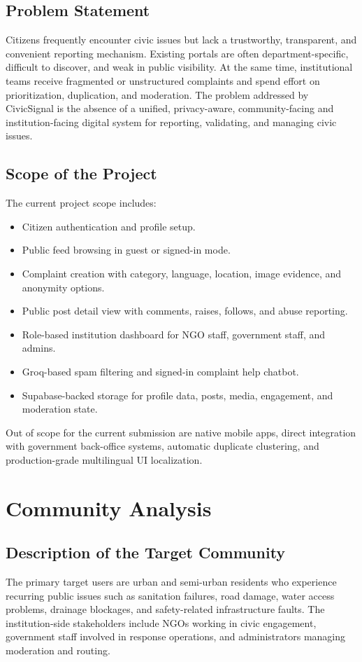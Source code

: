 \documentclass[12pt,a4paper]{report}
\begin{document}
\section{Problem Statement}
Citizens frequently encounter civic issues but lack a trustworthy, transparent, and convenient reporting mechanism. Existing portals are often department-specific, difficult to discover, and weak in public visibility. At the same time, institutional teams receive fragmented or unstructured complaints and spend effort on prioritization, duplication, and moderation. The problem addressed by CivicSignal is the absence of a unified, privacy-aware, community-facing and institution-facing digital system for reporting, validating, and managing civic issues.

\section{Scope of the Project}
The current project scope includes:
\begin{itemize}
  \item Citizen authentication and profile setup.
  \item Public feed browsing in guest or signed-in mode.
  \item Complaint creation with category, language, location, image evidence, and anonymity options.
  \item Public post detail view with comments, raises, follows, and abuse reporting.
  \item Role-based institution dashboard for NGO staff, government staff, and admins.
  \item Groq-based spam filtering and signed-in complaint help chatbot.
  \item Supabase-backed storage for profile data, posts, media, engagement, and moderation state.
\end{itemize}

Out of scope for the current submission are native mobile apps, direct integration with government back-office systems, automatic duplicate clustering, and production-grade multilingual UI localization.

\chapter{Community Analysis}
\section{Description of the Target Community}
The primary target users are urban and semi-urban residents who experience recurring public issues such as sanitation failures, road damage, water access problems, drainage blockages, and safety-related infrastructure faults. The institution-side stakeholders include NGOs working in civic engagement, government staff involved in response operations, and administrators managing moderation and routing.
\end{document}
